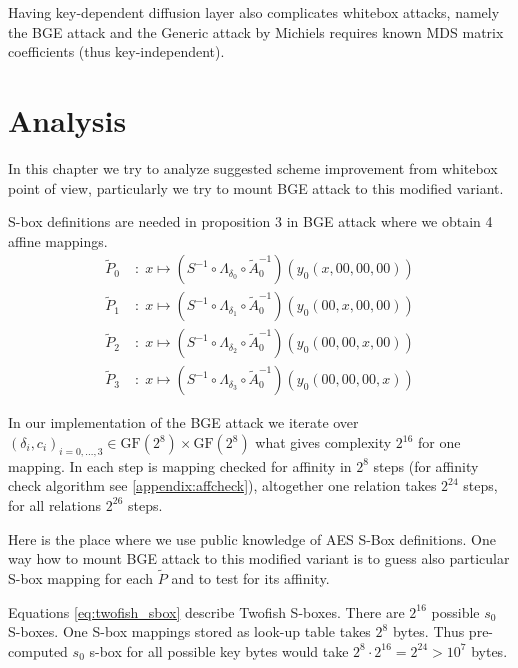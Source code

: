 \documentclass[11pt,oneside,final]{fithesis2}
\newcommand{\gfe}{\ensuremath{\text{GF}\left(2^8\right)}}
\begin{document}
    Having key-dependent diffusion layer also complicates whitebox attacks, namely the BGE attack \citep{Billet:2004:CWB:2080787.2080809} and 
    the Generic attack by Michiels \citep{Michiels:2007:MST:1314276.1314291} requires known MDS matrix coefficients (thus key-independent).    
    
    \section{Analysis}
    In this chapter we try to analyze suggested scheme improvement from whitebox point of view, particularly we try to mount BGE attack to this modified variant. 

    S-box definitions are needed in proposition 3 in BGE attack where we obtain 4 affine mappings.
    \begin{subequations}\label{eq:BGE_prop3}
    \begin{align}
	\widetilde{P}_0 \;&: \; x \mapsto \left( S^{-1} \circ \Lambda_{\delta_0} \circ \widetilde{A}_0^{-1}\right) \left( y_0\left(x, 00, 00, 00\right) \right)\\
	\widetilde{P}_1 \;&: \; x \mapsto \left( S^{-1} \circ \Lambda_{\delta_1} \circ \widetilde{A}_0^{-1}\right) \left( y_0\left(00, x, 00, 00\right) \right)\\
	\widetilde{P}_2 \;&: \; x \mapsto \left( S^{-1} \circ \Lambda_{\delta_2} \circ \widetilde{A}_0^{-1}\right) \left( y_0\left(00, 00, x, 00\right) \right)\\
	\widetilde{P}_3 \;&: \; x \mapsto \left( S^{-1} \circ \Lambda_{\delta_3} \circ \widetilde{A}_0^{-1}\right) \left( y_0\left(00, 00, 00, x\right) \right)
    \end{align}
    \end{subequations}
    
    In our implementation of the BGE attack we iterate over $\left(\delta_i, c_i\right)_{i=0,\dots,3} \in \gfe \times \gfe$ what gives complexity $2^{16}$ for one mapping.
    In each step is mapping checked for affinity in $2^8$ steps (for affinity check algorithm see \ref{appendix:affcheck}), altogether one relation takes $2^{24}$ steps, for all relations
    $2^{26}$ steps.
    
    Here is the place where we use public knowledge of AES S-Box definitions. One way how to mount BGE attack to this modified variant is to guess also particular S-box
    mapping for each $\widetilde{P}$ and to test for its affinity. 
    
    Equations \ref{eq:twofish_sbox} describe Twofish S-boxes. There are $2^{16}$ possible $s_0$ S-boxes. One S-box mappings stored as look-up table takes $2^8$ bytes.
    Thus pre-computed $s_0$ s-box for all possible key bytes would take $2^8 \cdot 2^{16} = 2^{24} > 10^7$ bytes. 
    
\end{document}
